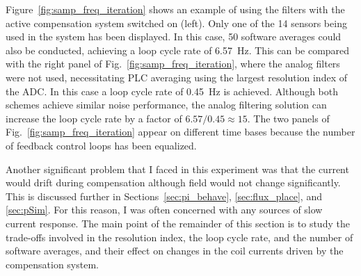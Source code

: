 Figure~\ref{fig:samp_freq_iteration} shows an example of using the
filters with the active compensation system switched on (left).  Only
one of the 14 sensors being used in the system has been displayed.  In
this case, 50 software averages could also be conducted, achieving a
loop cycle rate of 6.57~Hz.  This can be compared with the right panel
of Fig.~\ref{fig:samp_freq_iteration}, where the analog filters were
not used, necessitating PLC averaging using the largest resolution
index of the ADC.  In this case a loop cycle rate of 0.45~Hz is
achieved.  Although both schemes achieve similar noise performance,
the analog filtering solution can increase the loop cycle rate by a
factor of $6.57/0.45\approx 15$.  The two panels of
Fig.~\ref{fig:samp_freq_iteration} appear on different time bases
because the number of feedback control loops has been equalized.



Another significant problem that I faced in this experiment was that
the current would drift during compensation although field would not
change significantly.  This is discussed further in Sections~\ref{sec:pi_behave}, \ref{sec:flux_place}, and \ref{sec:pSim}.  For this reason, I was
often concerned with any sources of slow current response.  The main
point of the remainder of this section is to study the trade-offs
involved in the resolution index, the loop cycle rate, and the number
of software averages, and their effect on changes in the coil currents
driven by the compensation system.


